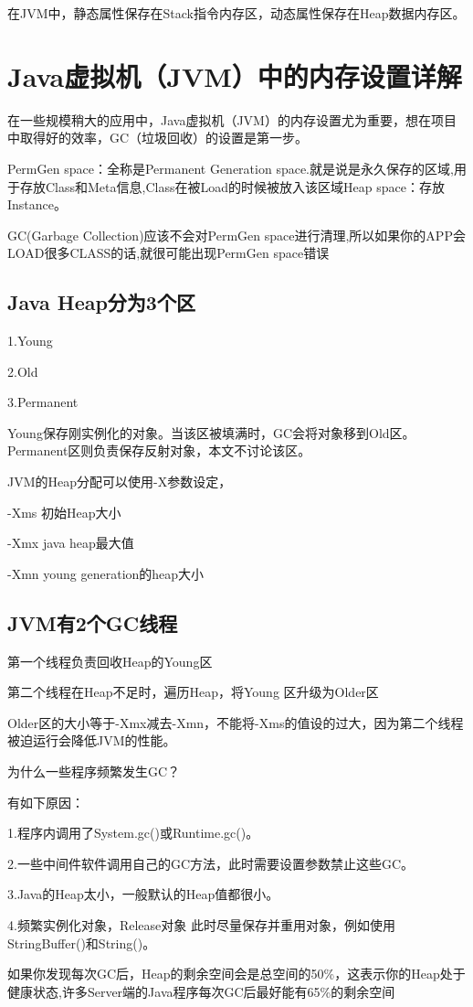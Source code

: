 \documentclass[10pt,b5paper]{article}
\begin{document}
在JVM中，静态属性保存在Stack指令内存区，动态属性保存在Heap数据内存区。
\section{Java虚拟机（JVM）中的内存设置详解}
\label{sec-5}
在一些规模稍大的应用中，Java虚拟机（JVM）的内存设置尤为重要，想在项目中取得好的效率，GC（垃圾回收）的设置是第一步。

PermGen space：全称是Permanent Generation space.就是说是永久保存的区域,用于存放Class和Meta信息,Class在被Load的时候被放入该区域Heap space：存放Instance。

GC(Garbage Collection)应该不会对PermGen space进行清理,所以如果你的APP会LOAD很多CLASS的话,就很可能出现PermGen space错误

\subsection{Java Heap分为3个区}
\label{sec-5-1}
1.Young

2.Old

3.Permanent

Young保存刚实例化的对象。当该区被填满时，GC会将对象移到Old区。Permanent区则负责保存反射对象，本文不讨论该区。

JVM的Heap分配可以使用-X参数设定，

-Xms 初始Heap大小

-Xmx java heap最大值 

-Xmn young generation的heap大小
\subsection{JVM有2个GC线程}
\label{sec-5-2}
第一个线程负责回收Heap的Young区

第二个线程在Heap不足时，遍历Heap，将Young 区升级为Older区

Older区的大小等于-Xmx减去-Xmn，不能将-Xms的值设的过大，因为第二个线程被迫运行会降低JVM的性能。

为什么一些程序频繁发生GC？

有如下原因：

1.程序内调用了System.gc()或Runtime.gc()。

2.一些中间件软件调用自己的GC方法，此时需要设置参数禁止这些GC。

3.Java的Heap太小，一般默认的Heap值都很小。

4.频繁实例化对象，Release对象 此时尽量保存并重用对象，例如使用StringBuffer()和String()。

如果你发现每次GC后，Heap的剩余空间会是总空间的50\%，这表示你的Heap处于健康状态,许多Server端的Java程序每次GC后最好能有65\%的剩余空间
\end{document}
